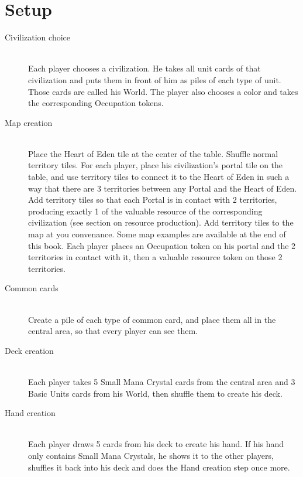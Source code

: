 \documentclass[a4paper]{article}
\begin{document}
\section{Setup}

    \begin{description}
        \item[Civilization choice] \hfill \\
            Each player chooses a civilization.
            He takes all unit cards of that civilization and puts them in front of him as piles of each type of unit.
            Those cards are called his World.
            The player also chooses a color and takes the corresponding Occupation tokens.
        \item[Map creation] \hfill \\
            Place the Heart of Eden tile at the center of the table.
            Shuffle normal territory tiles.
            For each player, place his civilization's portal tile on the table, and use territory tiles
            to connect it to the Heart of Eden in such a way that there are 3 territories between any Portal and the Heart of Eden.
            Add territory tiles so that each Portal is in contact with 2 territories, producing exactly 1 of the valuable
            resource of the corresponding civilization (see section on resource production).
            Add territory tiles to the map at you convenance. Some map examples are available at the end of this book.
            Each player places an Occupation token on his portal and the 2 territories in contact with it,
            then a valuable resource token on those 2 territories.
        \item[Common cards] \hfill \\
            Create a pile of each type of common card, and place them all in the central area, so that
            every player can see them.
        \item[Deck creation] \hfill \\
            Each player takes 5 Small Mana Crystal cards from the central area and
            3 Basic Units cards from his World, then shuffle them to create his deck.
        \item[Hand creation] \hfill \\
            Each player draws 5 cards from his deck to create his hand.
            If his hand only contains Small Mana Crystals, he shows it to the other players, shuffles it back into his deck
            and does the Hand creation step once more.
    \end{description}
\end{document}
